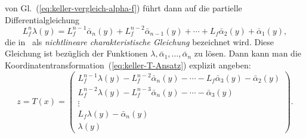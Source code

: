 von Gl.~(\ref{eq:keller-vergleich-alpha-f}) führt dann auf die partielle
Differentialgleichung 
\begin{equation}
L_{f}^{n}\lambda(y)=L_{f}^{n-1}\bar{\alpha}_{n}(y)+L_{f}^{n-2}\bar{\alpha}_{n-1}(y)+\cdots+L_{f}\bar{\alpha}_{2}(y)+\bar{\alpha}_{1}(y),\label{eq:ncg}
\end{equation}
die in~\cite{keller86} als \emph{nichtlineare charakteristische
Gleichung} bezeichnet wird. Diese Gleichung ist bezüglich der Funktionen
$\lambda,\bar{\alpha}_{1},\ldots,\bar{\alpha}_{n}$ zu lösen. Dann
kann man die Koordinatentransformation~(\ref{eq:keller-T-Ansatz})
explizit angeben: 
\[
z=T(x)=\left(\begin{array}{c}
L_{f}^{n-1}\lambda(y)-L_{f}^{n-2}\bar{\alpha}_{n}(y)-\cdots-L_{f}\bar{\alpha}_{3}(y)-\bar{\alpha}_{2}(y)\\
L_{f}^{n-2}\lambda(y)-L_{f}^{n-3}\bar{\alpha}_{n}(y)-\cdots-\bar{\alpha}_{3}(y)\\
\vdots\\
L_{f}\lambda(y)-\bar{\alpha}_{n}(y)\\
\lambda(y)
\end{array}\right).
\]

